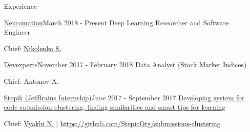 \documentclass{resume} %
\begin{document}
\begin{rSection}{Experience}

\begin{rSubsection}{\href{http://stepik.org/}{Neuromation}}{March 2018 - Present}
{Deep Learning Researcher and Software Engineer}{} 
\item[] Chief: \href{https://logic.pdmi.ras.ru/~sergey/}{Nikolenko S.}
\end{rSubsection}

\begin{rSubsection}{\href{http://stepik.org/}{Devexperts}}{November 2017 - February 2018}
{Data Analyst (Stock Market Indices)}{} 
\item[] Chief: Antonov A.
\end{rSubsection}

\begin{rSubsection}{\href{http://stepik.org/}{Stepik (JetBrains Internship)}}{June 2017 - September 2017}
{\href{https://jetbrains.ru/students/internship/themes/again/}{Developing system for code submission clustering, finding similarities and smart tips for learning}}{} 
\item[] Chief: \href{http://bioinformaticsinstitute.ru/teachers/vyahhi}{Vyakhi N.} | \url{https://github.com/StepicOrg/submissions-clustering}
\end{rSubsection}

\end{rSection} 
\vspace{-1.2\baselineskip}
\end{document}
